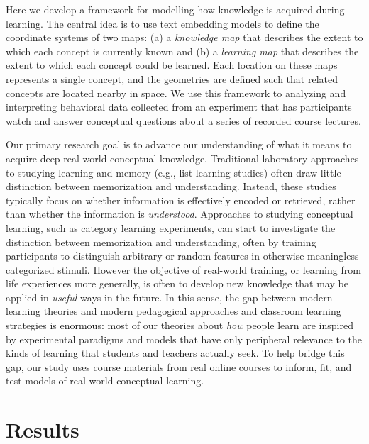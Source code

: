 \documentclass[10pt]{article}
\begin{document}
Here we develop a framework for modelling how knowledge is acquired during
learning. The central idea is to use text embedding models to define the
coordinate systems of two maps: (a) a \textit{knowledge map} that describes the
extent to which each concept is currently known and (b) a \textit{learning map}
that describes the extent to which each concept could be learned. Each location
on these maps represents a single concept, and the geometries are defined such
that related concepts are located nearby in space. We use this framework to
analyzing and interpreting behavioral data collected from an experiment that
has participants watch and answer conceptual questions about a series of
recorded course lectures.

Our primary research goal is to advance our understanding of what it means to
acquire deep real-world conceptual knowledge. Traditional laboratory approaches
to studying learning and memory (e.g., list learning studies) often draw little
distinction between memorization and understanding. Instead, these studies
typically focus on whether information is effectively encoded or retrieved,
rather than whether the information is \textit{understood}. Approaches to
studying conceptual learning, such as category learning experiments, can start
to investigate the distinction between memorization and understanding, often by
training participants to distinguish arbitrary or random features in otherwise
meaningless categorized stimuli. However the objective of real-world training,
or learning from life experiences more generally, is often to develop new
knowledge that may be applied in \textit{useful} ways in the future. In this
sense, the gap between modern learning theories and modern pedagogical
approaches and classroom learning strategies is enormous: most of our theories
about \textit{how} people learn are inspired by experimental paradigms and
models that have only peripheral relevance to the kinds of learning that
students and teachers actually seek. To help bridge this gap, our study uses
course materials from real online courses to inform, fit, and test models of
real-world conceptual learning.

\section*{Results}
\end{document}
